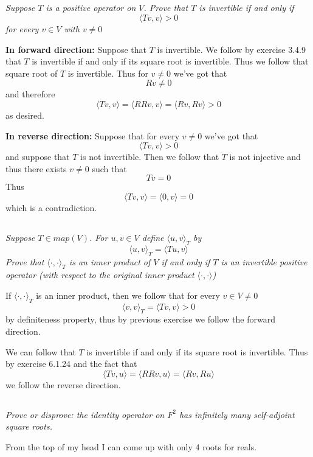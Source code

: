 \documentclass[11pt,oneside,titlepage]{book}
\newcommand{\eangle}[1]{\langle #1 \rangle}
\begin{document}
\subsection{}

\textit{Suppose $T$ is a positive operator on $V$. Prove that $T$ is invertible if and only if 
$$\eangle{Tv, v} > 0$$
for every $v \in V$ with $v \neq 0$}


\textbf{In forward direction: }
Suppose that $T$ is invertible. We follow by exercise 3.4.9 that $T$ is invertible if and
only if its square root is invertible. Thus we follow that square root of $T$ is invertible.
Thus for $v \neq 0$ we've got that
$$Rv \neq 0$$
and therefore
$$\eangle{Tv, v} = \eangle{RRv, v} = \eangle{Rv, Rv} > 0$$
as desired.

\textbf{In reverse direction: }
Suppose that for every $v \neq 0$ we've got that
$$\eangle{Tv, v} > 0$$
and suppose that $T$ is not invertible. Then we follow that $T$ is not injective and thus
there exists $v \neq 0$ such that
$$Tv = 0$$
Thus
$$\eangle{Tv, v} = \eangle{0, v} = 0$$
which is a contradiction.


\subsection{}

\textit{Suppose $T \in map(V)$. For $u, v \in V$ define $\eangle{u, v}_T$ by
$$\eangle{u, v}_T = \eangle{Tu, v}$$
Prove that $\eangle{\cdot, \cdot}_T$ is an inner product of $V$ if and only if $T$ is an
invertible positive operator (with respect to the original inner product $\eangle{\cdot, \cdot}$)}

If $\eangle{\cdot, \cdot}_T$ is an inner product, then we follow that for every $v \in V \neq 0$
$$\eangle{v, v}_T = \eangle{Tv, v} > 0$$
by definiteness property, thus by previous exercise we follow the forward direction.

We can follow that $T$ is invertible if and only if its square root is invertible. Thus by
exercise 6.1.24 and the fact that
$$\eangle{Tv, u} = \eangle{RRv, u} = \eangle{Rv, Ru}$$
we follow the reverse direction.


\subsection{}

\textit{Prove or disprove: the identity operator on $F^2$ has infinitely many
  self-adjoint square roots.}

From the top of my head I can come up with only 4 roots for reals.
\end{document}
